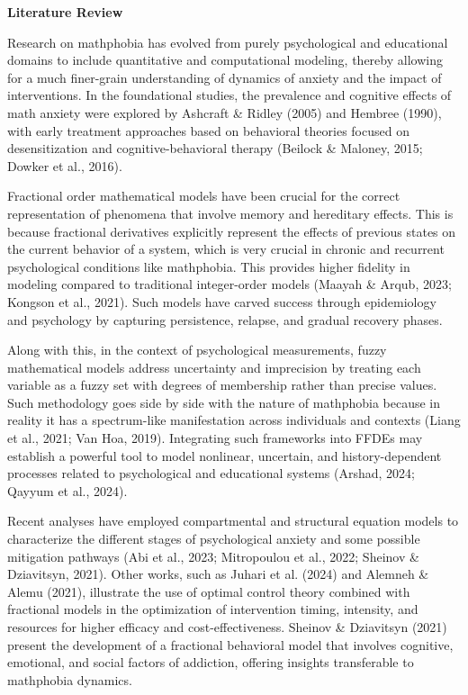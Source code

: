 \documentclass[
]{article}
\begin{document}
\textbf{Literature Review}

Research on mathphobia has evolved from purely psychological and educational domains to include quantitative and computational modeling, thereby allowing for a much finer-grain understanding of dynamics of anxiety and the impact of interventions. In the foundational studies, the prevalence and cognitive effects of math anxiety were explored by Ashcraft \& Ridley (2005) and Hembree (1990), with early treatment approaches based on behavioral theories focused on desensitization and cognitive-behavioral therapy (Beilock \& Maloney, 2015; Dowker et al., 2016).

Fractional order mathematical models have been crucial for the correct representation of phenomena that involve memory and hereditary effects. This is because fractional derivatives explicitly represent the effects of previous states on the current behavior of a system, which is very crucial in chronic and recurrent psychological conditions like mathphobia. This provides higher fidelity in modeling compared to traditional integer-order models (Maayah \& Arqub, 2023; Kongson et al., 2021). Such models have carved success through epidemiology and psychology by capturing persistence, relapse, and gradual recovery phases.

Along with this, in the context of psychological measurements, fuzzy mathematical models address uncertainty and imprecision by treating each variable as a fuzzy set with degrees of membership rather than precise values. Such methodology goes side by side with the nature of mathphobia because in reality it has a spectrum-like manifestation across individuals and contexts (Liang et al., 2021; Van Hoa, 2019). Integrating such frameworks into FFDEs may establish a powerful tool to model nonlinear, uncertain, and history-dependent processes related to psychological and educational systems (Arshad, 2024; Qayyum et al., 2024).

Recent analyses have employed compartmental and structural equation models to characterize the different stages of psychological anxiety and some possible mitigation pathways (Abi et al., 2023; Mitropoulou et al., 2022; Sheinov \& Dziavitsyn, 2021). Other works, such as Juhari et al. (2024) and Alemneh \& Alemu (2021), illustrate the use of optimal control theory combined with fractional models in the optimization of intervention timing, intensity, and resources for higher efficacy and cost-effectiveness. Sheinov \& Dziavitsyn (2021) present the development of a fractional behavioral model that involves cognitive, emotional, and social factors of addiction, offering insights transferable to mathphobia dynamics.
\end{document}

